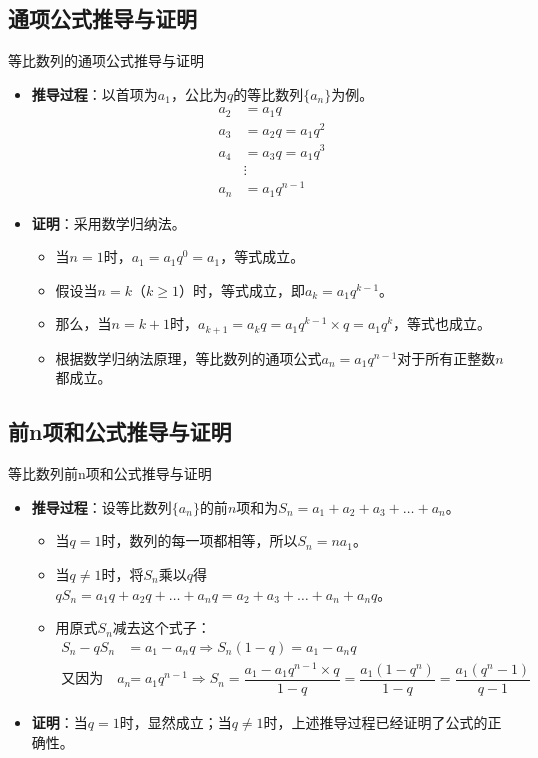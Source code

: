 \documentclass[aspectratio=169]{ctexbeamer} %
\begin{document}
\subsection{通项公式推导与证明}
\begin{frame}{等比数列的通项公式推导与证明}
\begin{itemize}
\item \textbf{推导过程}：以首项为$a_1$，公比为$q$的等比数列$\{a_n\}$为例。
\begin{align*}
a_2 &= a_1 q \\
a_3 &= a_2 q = a_1 q^2 \\
a_4 &= a_3 q = a_1 q^3 \\
&\vdots \\
a_n &= a_1 q^{n-1}
\end{align*}
\item \textbf{证明}：采用数学归纳法。
\begin{itemize}
\item 当$n = 1$时，$a_1 = a_1 q^0 = a_1$，等式成立。
\item 假设当$n = k$（$k \geq 1$）时，等式成立，即$a_k = a_1 q^{k-1}$。
\item 那么，当$n = k + 1$时，$a_{k+1} = a_k q = a_1 q^{k-1} \times q = a_1 q^k$，等式也成立。
\item 根据数学归纳法原理，等比数列的通项公式$a_n = a_1 q^{n-1}$对于所有正整数$n$都成立。
\end{itemize}
\end{itemize}
\end{frame}

\subsection{前n项和公式推导与证明}
\begin{frame}{等比数列前n项和公式推导与证明}
\begin{itemize}
\item \textbf{推导过程}：设等比数列$\{a_n\}$的前$n$项和为$S_n = a_1 + a_2 + a_3 + \dots + a_n$。
\begin{itemize}
\item 当$q = 1$时，数列的每一项都相等，所以$S_n = n a_1$。
\item 当$q \neq 1$时，将$S_n$乘以$q$得$q S_n = a_1 q + a_2 q + \dots + a_n q = a_2 + a_3 + \dots + a_n + a_n q$。
\item 用原式$S_n$减去这个式子：
\begin{align*}
S_n - q S_n &= a_1 - a_n q \Rightarrow S_n (1 - q) = a_1 - a_n q \\
\text{又因为}\quad a_n &= a_1 q^{n-1} \Rightarrow S_n = \dfrac{a_1 - a_1 q^{n-1} \times q}{1 - q} = \dfrac{a_1 (1 - q^n)}{1 - q} = \dfrac{a_1 (q^n - 1)}{q - 1}
\end{align*}
\end{itemize}
\item \textbf{证明}：当$q = 1$时，显然成立；当$q \neq 1$时，上述推导过程已经证明了公式的正确性。
\end{itemize}
\end{frame}
\end{document}
